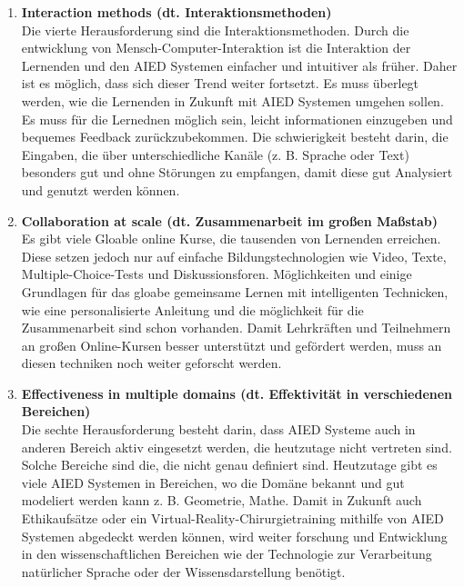 \begin{enumerate}
    \item \textbf{Interaction methods (dt. Interaktionsmethoden)} \\
    Die vierte Herausforderung sind die Interaktionsmethoden. Durch die entwicklung von Mensch-Computer-Interaktion ist die Interaktion der Lernenden und den AIED Systemen einfacher und intuitiver als früher.
    Daher ist es möglich, dass sich dieser Trend weiter fortsetzt. Es muss überlegt werden, wie die Lernenden in Zukunft mit AIED Systemen umgehen sollen.
    Es muss für die Lernednen möglich sein, leicht informationen einzugeben und bequemes Feedback zurückzubekommen.
    Die schwierigkeit besteht darin, die Eingaben, die über unterschiedliche Kanäle (z. B. Sprache oder Text) besonders gut und ohne Störungen zu empfangen, damit diese gut Analysiert und genutzt werden können. \cite[S. 11]{Pinkwart.2016}

    \item \textbf{Collaboration at scale (dt. Zusammenarbeit im großen Maßstab)} \\
    Es gibt viele Gloable online Kurse, die tausenden von Lernenden erreichen. Diese setzen jedoch nur auf einfache Bildungstechnologien wie Video, Texte, Multiple-Choice-Tests und Diskussionsforen.
    Möglichkeiten und einige Grundlagen für das gloabe gemeinsame Lernen mit intelligenten Technicken, wie eine personalisierte Anleitung und die möglichkeit für die Zusammenarbeit sind schon vorhanden. 
    Damit Lehrkräften und Teilnehmern an großen Online-Kursen besser unterstützt und gefördert werden, muss an diesen techniken noch weiter geforscht werden. \cite[S. 11]{Pinkwart.2016}
    
    \item \textbf{Effectiveness in multiple domains (dt. Effektivität in verschiedenen Bereichen)} \\
    Die sechte Herausforderung besteht darin, dass AIED Systeme auch in anderen Bereich aktiv eingesetzt werden, die heutzutage nicht vertreten sind. Solche Bereiche sind die, die nicht genau definiert sind.
    Heutzutage gibt es viele AIED Systemen in Bereichen, wo die Domäne bekannt und gut modeliert werden kann z. B. Geometrie, Mathe.
    Damit in Zukunft auch Ethikaufsätze oder ein Virtual-Reality-Chirurgietraining mithilfe von AIED Systemen abgedeckt werden können, wird weiter forschung und Entwicklung in den wissenschaftlichen Bereichen wie der Technologie zur Verarbeitung natürlicher Sprache oder der Wissensdarstellung benötigt. \cite[S. 11f]{Pinkwart.2016}
     


\end{enumerate}
